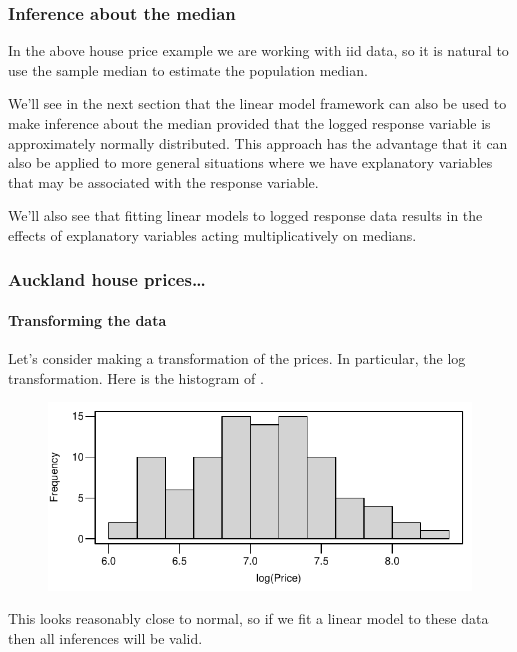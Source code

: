 \documentclass{beamer}\usepackage[]{graphicx}\usepackage[]{xcolor}
\begin{document}
\begin{frame}[fragile]
\frametitle{Inference about the median}

In the above house price example we are working with iid data, 
so it is natural to use the sample median to estimate the population median.
\bigskip \bigskip

We'll see in the next section that the linear model framework can also be used to make
inference about the median provided that the logged response variable is approximately normally distributed.
This approach has the advantage that it can also be applied to more general situations where we have explanatory variables that may be associated with the response variable. 
\medskip

We'll also see that fitting linear models to logged response data results in the effects of explanatory variables acting multiplicatively on medians.

\end{frame}



\begin{frame}[fragile]
\frametitle{Auckland house prices\ldots}
\framesubtitle{Transforming the data}
Let's consider making a transformation of the prices. In particular, the log transformation.
Here is the histogram of .



\begin{figure}
  \centering
  \includegraphics{figure/RC-H06-010}
\end{figure}

This looks reasonably close to normal, so if we fit a linear model to these data then all inferences will be valid.
\end{frame}
\end{document}
